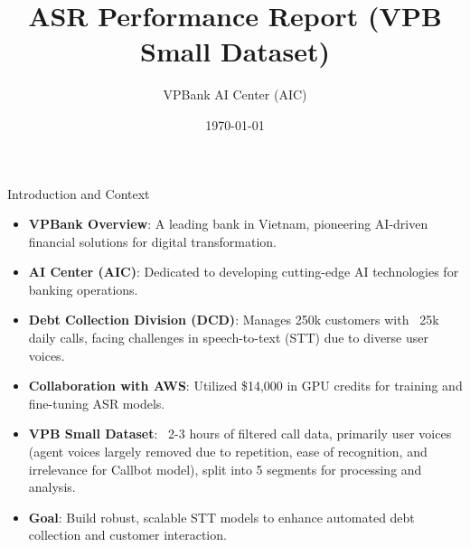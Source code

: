 \documentclass{beamer}
\title{ASR Performance Report (VPB Small Dataset)}
\author{VPBank AI Center (AIC)}
\date{\today}
\begin{document}
\begin{frame}
    \titlepage
\end{frame}

\begin{frame}{Introduction and Context}
    \begin{itemize}
        \item \textbf{VPBank Overview}: A leading bank in Vietnam, pioneering AI-driven financial solutions for digital transformation.
        \item \textbf{AI Center (AIC)}: Dedicated to developing cutting-edge AI technologies for banking operations.
        \item \textbf{Debt Collection Division (DCD)}: Manages 250k customers with ~25k daily calls, facing challenges in speech-to-text (STT) due to diverse user voices.
        \item \textbf{Collaboration with AWS}: Utilized \$14,000 in GPU credits for training and fine-tuning ASR models.
        \item \textbf{VPB Small Dataset}: ~2-3 hours of filtered call data, primarily user voices (agent voices largely removed due to repetition, ease of recognition, and irrelevance for Callbot model), split into 5 segments for processing and analysis.
        \item \textbf{Goal}: Build robust, scalable STT models to enhance automated debt collection and customer interaction.
    \end{itemize}
\end{frame}
\end{document}
